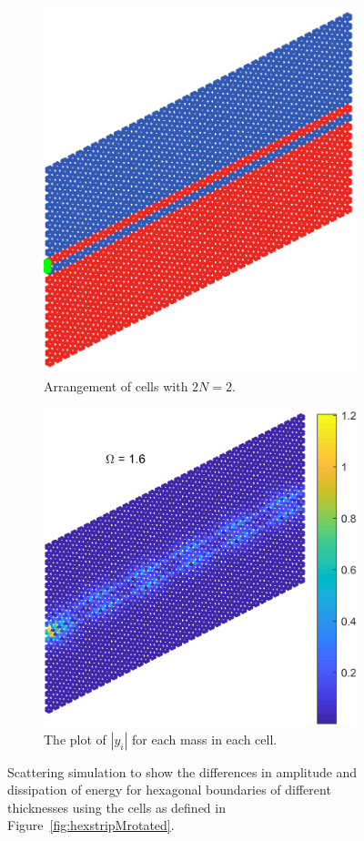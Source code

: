 \begin{figure}
\medskip
\begin{subfigure}[b]{.5\textwidth}
  \centering
  \includegraphics[width=0.7\linewidth]{imgs/svbthinnerarr.png}
  \caption{Arrangement of cells with $2N=2$.}
  \label{fig:sub1}
\end{subfigure}%
\begin{subfigure}[b]{.5\textwidth}
  \centering
  \includegraphics[width=0.9\linewidth]{imgs/svbthinnerscat.png}
  \caption{The plot of $|y_i|$ for each mass in each cell.}
  \label{fig:sub2}
\end{subfigure}
\caption{Scattering simulation to show the differences in amplitude and
  dissipation of energy for hexagonal boundaries of different thicknesses using
  the cells as defined in Figure~\ref{fig:hexstripMrotated}.}
\label{fig:smallvsbig}
\end{figure}

